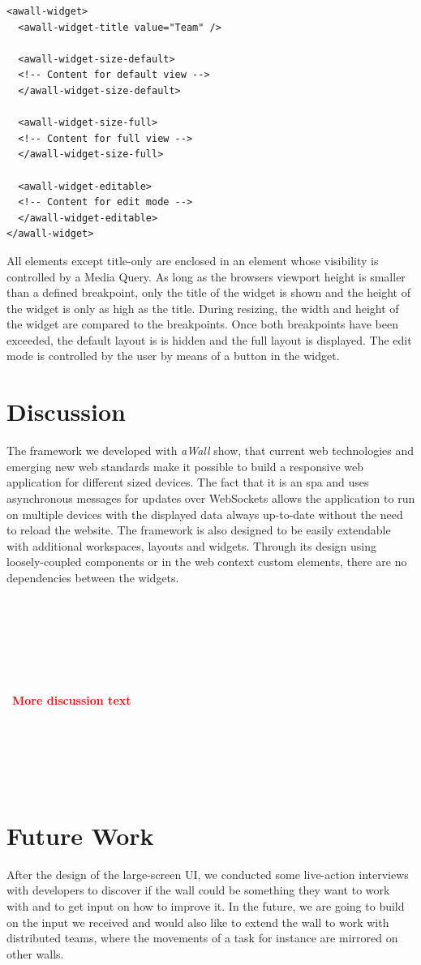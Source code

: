 \documentclass{sigchi}
\newcommand\todo[1]{~\\\\~\\~\\~\\~\\~\textbf{\huge{\textcolor{red}{#1}}}\\~\\~\\~\\~\\~}
\begin{document}
\begin{lstlisting}
<awall-widget>
  <awall-widget-title value="Team" />

  <awall-widget-size-default>
  <!-- Content for default view -->
  </awall-widget-size-default>
   
  <awall-widget-size-full>
  <!-- Content for full view -->
  </awall-widget-size-full>
   
  <awall-widget-editable>
  <!-- Content for edit mode -->
  </awall-widget-editable>
</awall-widget>
\end{lstlisting}
 
All elements except title-only are enclosed in an element whose visibility is controlled by a Media Query.
As long as the browsers viewport height is smaller than a defined breakpoint, only the title of the widget is shown and the height of the widget is only as high as the title.
During resizing, the width and height of the widget are compared to the breakpoints.
Once both breakpoints have been exceeded, the default layout is is hidden and the full layout is displayed.
The edit mode is controlled by the user by means of a button in the widget.


\section{Discussion}

The framework we developed with \textit{aWall} show, that current web technologies and emerging new web standards make it possible to build a responsive web application for different sized devices. 
The fact that it is an \gls{spa} and uses asynchronous messages for updates over WebSockets allows the application to run on multiple devices with the displayed data always up-to-date without the need to reload the website.
The framework is also designed to be easily extendable with additional workspaces, layouts and widgets.
Through its design using loosely-coupled components or in the web context custom elements, there are no dependencies between the widgets.

\todo{More discussion text}

\section{Future Work}
After the design of the large-screen UI, we conducted some live-action interviews with developers to discover if the wall could be something they want to work with and to get input on how to improve it.
In the future, we are going to build on the input we received and would also like to extend the wall to work with distributed teams, where the movements  of a task for instance are mirrored on other walls.



\balance{}



\end{document}
